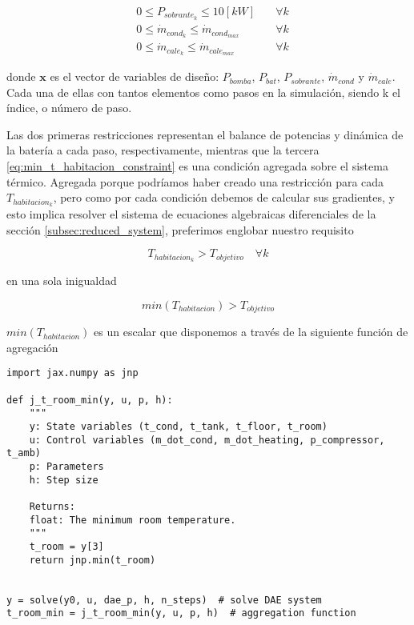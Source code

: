 \begin{align}
	                        & 0 \leq P_{sobrante_k} \leq 10[kW] \quad                                                                                    & \forall k     \\
	                        & 0 \leq \dot{m}_{cond_k} \leq \dot{m}_{cond_{max}} \quad                                                                    & \forall k     \\
	                        & 0 \leq \dot{m}_{cale_k} \leq \dot{m}_{cale_{max}} \quad                                                                    & \forall k
\end{align}


donde $\mathbf{x}$ es el vector de variables de diseño: $P_{bomba}$, $P_{bat}$,
$P_{sobrante}$, $\dot{m}_{cond}$ y $\dot{m}_{cale}$. Cada una de ellas con
tantos elementos como pasos en la simulación, siendo k el índice, o número de
paso.

Las dos primeras restricciones representan el balance de potencias y dinámica
de la batería a cada paso, respectivamente, mientras que la tercera
\eqref{eq:min_t_habitacion_constraint} es una condición agregada sobre el
sistema térmico. Agregada porque podríamos haber creado una restricción para
cada $T_{habitacion_k}$, pero como por cada condición debemos de calcular sus
gradientes, y esto implica resolver el sistema de ecuaciones algebraicas
diferenciales de la sección \ref{subsec:reduced_system}, preferimos englobar
nuestro requisito

\begin{equation*}
	T_{habitacion_k} > T_{objetivo}  \quad \forall k
\end{equation*}

en una sola inigualdad

\begin{equation*}
	min(T_{habitacion}) > T_{objetivo}
\end{equation*}


$min(T_{habitacion})$ es un escalar que disponemos a través de la siguiente
función de agregación

\begin{verbatim}
import jax.numpy as jnp

def j_t_room_min(y, u, p, h):
    """
    y: State variables (t_cond, t_tank, t_floor, t_room)
    u: Control variables (m_dot_cond, m_dot_heating, p_compressor, t_amb)
    p: Parameters
    h: Step size

    Returns:
    float: The minimum room temperature.
    """
    t_room = y[3]
    return jnp.min(t_room)


y = solve(y0, u, dae_p, h, n_steps)  # solve DAE system
t_room_min = j_t_room_min(y, u, p, h)  # aggregation function
\end{verbatim}


